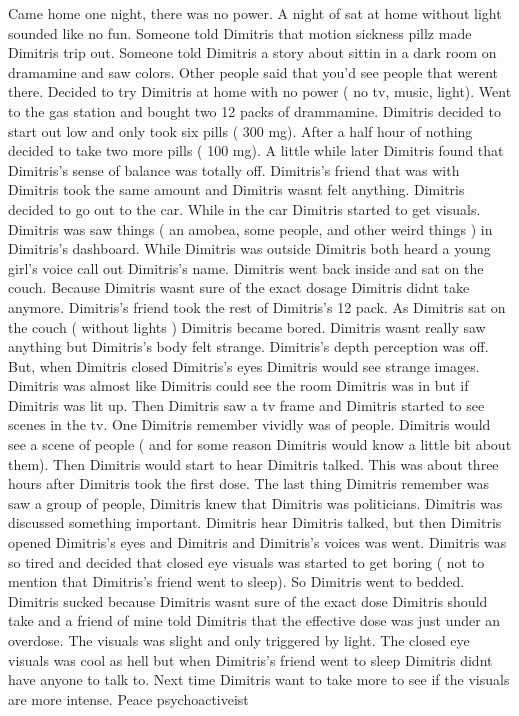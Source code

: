\documentclass[12pt]{book}
\begin{document}
Came home one night, there was no power. A night of sat at home without light sounded like no fun. Someone told Dimitris that motion sickness pillz made Dimitris trip out. Someone told Dimitris a story about sittin in a dark room on dramamine and saw colors. Other people said that you'd see people that werent there. Decided to try Dimitris at home with no power ( no tv, music, light). Went to the gas station and bought two 12 packs of drammamine. Dimitris decided to start out low and only took six pills ( 300 mg). After a half hour of nothing decided to take two more pills ( 100 mg). A little while later Dimitris found that Dimitris's sense of balance was totally off. Dimitris's friend that was with Dimitris took the same amount and Dimitris wasnt felt anything. Dimitris decided to go out to the car. While in the car Dimitris started to get visuals. Dimitris was saw things ( an amobea, some people, and other weird things ) in Dimitris's dashboard. While Dimitris was outside Dimitris both heard a young girl's voice call out Dimitris's name. Dimitris went back inside and sat on the couch. Because Dimitris wasnt sure of the exact dosage Dimitris didnt take anymore. Dimitris's friend took the rest of Dimitris's 12 pack. As Dimitris sat on the couch ( without lights ) Dimitris became bored. Dimitris wasnt really saw anything but Dimitris's body felt strange. Dimitris's depth perception was off. But, when Dimitris closed Dimitris's eyes Dimitris would see strange images. Dimitris was almost like Dimitris could see the room Dimitris was in but if Dimitris was lit up. Then Dimitris saw a tv frame and Dimitris started to see scenes in the tv. One Dimitris remember vividly was of people. Dimitris would see a scene of people ( and for some reason Dimitris would know a little bit about them). Then Dimitris would start to hear Dimitris talked. This was about three hours after Dimitris took the first dose. The last thing Dimitris remember was saw a group of people, Dimitris knew that Dimitris was politicians. Dimitris was discussed something important. Dimitris hear Dimitris talked, but then Dimitris opened Dimitris's eyes and Dimitris and Dimitris's voices was went. Dimitris was so tired and decided that closed eye visuals was started to get boring ( not to mention that Dimitris's friend went to sleep). So Dimitris went to bedded. Dimitris sucked because Dimitris wasnt sure of the exact dose Dimitris should take and a friend of mine told Dimitris that the effective dose was just under an overdose. The visuals was slight and only triggered by light. The closed eye visuals was cool as hell but when Dimitris's friend went to sleep Dimitris didnt have anyone to talk to. Next time Dimitris want to take more to see if the visuals are more intense. Peace psychoactiveist
\end{document}
